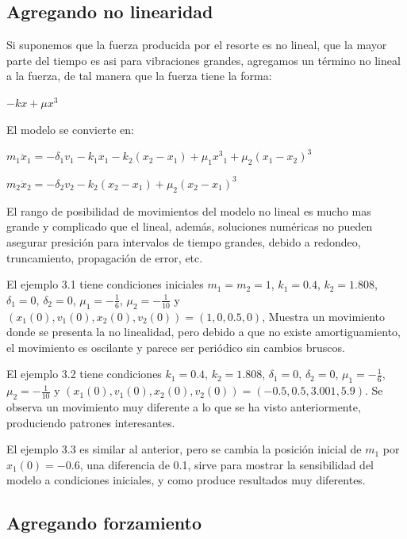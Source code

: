 \documentclass[a4paper]{article}
\begin{document}
\subsection{Agregando no linearidad}

Si suponemos que la fuerza producida por el resorte es no lineal, que la mayor parte del tiempo es asi para vibraciones grandes, agregamos un término no lineal a la fuerza, de tal manera que la fuerza tiene la forma:

\begin{center}
$-kx + \mu x^3$
\end{center}

El modelo se convierte en:

\begin{center}
	$m_1 \ddot{x}_1 = -{\delta}_1 v_1 - k_1 x_1 - k_2 (x_2 - x_1) + {\mu}_1 {x^3}_1 + {\mu}_2 (x_1 - x_2)^3$

	$m_2 \ddot{x}_2 = -{\delta}_2 v_2 -k_2 (x_2 - x_1) + {\mu}_2 (x_2 - x_1)^3$
\end{center}

El rango de posibilidad de movimientos del modelo no lineal es mucho mas grande y complicado que el lineal, además, soluciones numéricas no pueden asegurar presición para intervalos de tiempo grandes, debido a redondeo, truncamiento, propagación de error, etc.

El ejemplo 3.1 tiene condiciones iniciales $m_1 = m_2 = 1$, $k_1 = 0.4$, $k_2 = 1.808$, ${\delta}_1 = 0$, ${\delta}_2 = 0$, ${\mu}_1 = -\frac{1}{6}$, ${\mu}_2 = -\frac{1}{10}$ y $(x_1(0),v_1(0),x_2(0),v_2(0)) = (1,0,0.5,0)$, Muestra un movimiento donde se presenta la no linealidad, pero debido a que no existe amortiguamiento, el movimiento es oscilante y parece ser periódico sin cambios bruscos.

El ejemplo 3.2 tiene condiciones $k_1 = 0.4$, $k_2 = 1.808$, ${\delta}_1 = 0$, ${\delta}_2 = 0$, ${\mu}_1 = -\frac{1}{6}$, ${\mu}_2 = -\frac{1}{10}$ y $(x_1(0),v_1(0),x_2(0),v_2(0)) = (-0.5,0.5,3.001,5.9)$. Se observa un movimiento muy diferente a lo que se ha visto anteriormente, produciendo patrones interesantes.

El ejemplo 3.3 es similar al anterior, pero se cambia la posición inicial de $m_1$ por $x_1(0) = -0.6$, una diferencia de 0.1, sirve para mostrar la sensibilidad del modelo a condiciones iniciales, y como produce resultados muy diferentes. 

\subsection{Agregando forzamiento}
\end{document}

